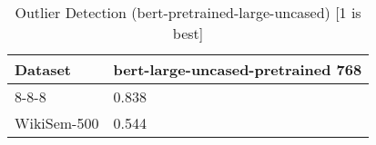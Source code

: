 \begin{table}[]
\centering
\begin{tabular}{l|l}
\hline
Dataset & bert-large-uncased-pretrained 768 \\
\hline
8-8-8 & 0.838 \\ 
WikiSem-500 & 0.544
\end{tabular}
\caption{Outlier Detection (bert-pretrained-large-uncased) [1 is best]}
\label{tab:outlier-bert-pretrained-large-uncased}
\end{table}

